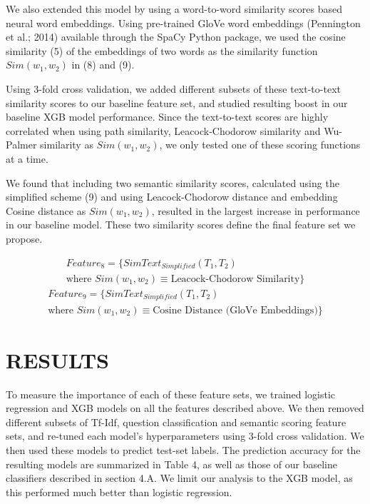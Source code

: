 \documentclass[letterpaper, 10 pt, conference]{ieeeconf}  %
\begin{document}
We also extended this model by using a word-to-word similarity scores based neural word embeddings. Using pre-trained GloVe word embeddings (Pennington et al.; 2014) available through the SpaCy Python package, we used the cosine similarity (5) of the embeddings of two words as the similarity function $Sim(w_1,w_2)$ in (8) and (9). 

Using 3-fold cross validation, we added different subsets of these text-to-text similarity scores to our baseline feature set, and studied resulting boost in our baseline XGB model performance. Since the text-to-text scores are highly correlated when using path similarity, Leacock-Chodorow similarity and Wu-Palmer similarity as $Sim(w_1, w_2)$, we only tested one of these scoring functions at a time. 

We found that including two semantic similarity scores, calculated using the simplified scheme (9) and using Leacock-Chodorow distance and embedding Cosine distance as $Sim(w_1, w_2)$, resulted in the largest increase in performance in our baseline model. These two similarity scores define the final feature set we propose. 

\begin{gather*} \tag{10}
Feature_{8} = \{SimText_{Simplified}(T_1, T_2) \\ \text{where } Sim(w_1, w_2) \equiv \text{Leacock-Chodorow Similarity}\}
\end{gather*}
\begin{gather*} \tag{11}
Feature_{9} = \{SimText_{Simplified}(T_1, T_2) \\ \text{where } Sim(w_1, w_2) \equiv \text{Cosine Distance (GloVe Embeddings)}\}
\end{gather*}


\section{RESULTS}

To measure the importance of each of these feature sets, we trained logistic regression and XGB models on all the features described above. We then removed different subsets of Tf-Idf, question classification and semantic scoring feature sets, and re-tuned each model's hyperparameters using 3-fold cross validation. We then used these models to predict test-set labels. The prediction accuracy for the resulting models are summarized in Table 4, as well as those of our baseline classifiers described in section 4.A. We limit our analysis to the XGB model, as this performed much better than logistic regression. 
\end{document}
